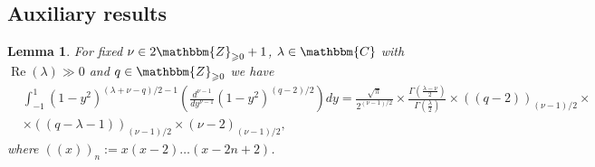 \documentclass{article}
\newcommand{\assign}{:=}
\newcommand{\tmop}[1]{\ensuremath{\operatorname{#1}}}
\numberwithin{definition}{section}
\newtheorem{lemma}{Lemma}
\numberwithin{lemma}{section}
\numberwithin{proposition}{section}
{\theorembodyfont{\rmfamily}\newtheorem{remark}{Remark}
\numberwithin{remark}{section}
}
\begin{document}
\subsection{Auxiliary results}

\begin{lemma}
  \label{KC-normalization-2:lem-kfin-00}For fixed $\nu \in
  2\mathbbm{Z}_{\geqslant 0} + 1$, $\lambda \in \mathbbm{C}$ with $\tmop{Re} (
  \lambda) \gg 0$ and $q \in \mathbbm{Z}_{\geqslant 0}$ we have
  \begin{eqnarray*}
    & \int_{- 1}^1 ( 1 - y^2)^{( \lambda + \nu - q) / 2 - 1} \left(
    \frac{d^{\nu - 1}}{d y^{\nu - 1}} ( 1 - y^2)^{( q - 2) / 2} \right) d y =
    \frac{\sqrt{\pi}}{2^{( \nu - 1) / 2}} \times \frac{\Gamma \left(
    \frac{\lambda - \nu}{2} \right)}{\Gamma \left( \frac{\lambda}{2} \right)}
    \times ( ( q - 2))_{( \nu - 1) / 2} \times & \\
    & \times ( ( q - \lambda - 1))_{( \nu - 1) / 2} \times ( \nu - 2)_{( \nu
    - 1) / 2}, & 
  \end{eqnarray*}
  where $( ( x))_n \assign x ( x - 2) \ldots ( x - 2 n + 2)$.
\end{lemma}
\end{document}
